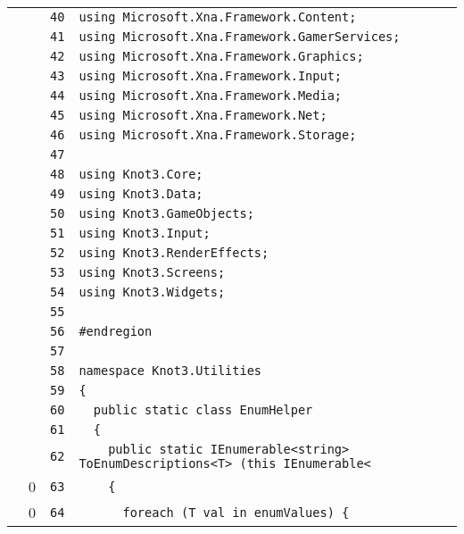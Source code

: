 \documentclass[a4paper,10pt]{article}
\begin{document}
\begin{longtable}[l]{lrrl}
\cellcolor{gray} &  & \verb~40~ & \verb~using Microsoft.Xna.Framework.Content;~\\
\cellcolor{gray} &  & \verb~41~ & \verb~using Microsoft.Xna.Framework.GamerServices;~\\
\cellcolor{gray} &  & \verb~42~ & \verb~using Microsoft.Xna.Framework.Graphics;~\\
\cellcolor{gray} &  & \verb~43~ & \verb~using Microsoft.Xna.Framework.Input;~\\
\cellcolor{gray} &  & \verb~44~ & \verb~using Microsoft.Xna.Framework.Media;~\\
\cellcolor{gray} &  & \verb~45~ & \verb~using Microsoft.Xna.Framework.Net;~\\
\cellcolor{gray} &  & \verb~46~ & \verb~using Microsoft.Xna.Framework.Storage;~\\
\cellcolor{gray} &  & \verb~47~ & \verb~~\\
\cellcolor{gray} &  & \verb~48~ & \verb~using Knot3.Core;~\\
\cellcolor{gray} &  & \verb~49~ & \verb~using Knot3.Data;~\\
\cellcolor{gray} &  & \verb~50~ & \verb~using Knot3.GameObjects;~\\
\cellcolor{gray} &  & \verb~51~ & \verb~using Knot3.Input;~\\
\cellcolor{gray} &  & \verb~52~ & \verb~using Knot3.RenderEffects;~\\
\cellcolor{gray} &  & \verb~53~ & \verb~using Knot3.Screens;~\\
\cellcolor{gray} &  & \verb~54~ & \verb~using Knot3.Widgets;~\\
\cellcolor{gray} &  & \verb~55~ & \verb~~\\
\cellcolor{gray} &  & \verb~56~ & \verb~#endregion~\\
\cellcolor{gray} &  & \verb~57~ & \verb~~\\
\cellcolor{gray} &  & \verb~58~ & \verb~namespace Knot3.Utilities~\\
\cellcolor{gray} &  & \verb~59~ & \verb~{~\\
\cellcolor{gray} &  & \verb~60~ & \verb~  public static class EnumHelper~\\
\cellcolor{gray} &  & \verb~61~ & \verb~  {~\\
\cellcolor{gray} &  & \verb~62~ & \verb~    public static IEnumerable<string> ToEnumDescriptions<T> (this IEnumerable<~\\
\cellcolor{red} & 0 & \verb~63~ & \verb~    {~\\
\cellcolor{red} & 0 & \verb~64~ & \verb~      foreach (T val in enumValues) {~\\

\end{longtable}
\end{document}
